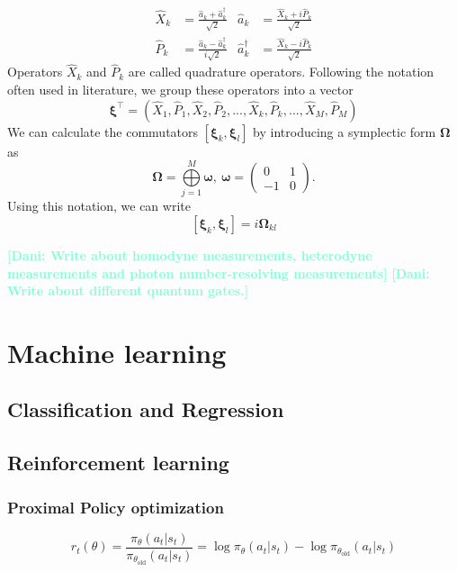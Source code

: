 \documentclass[12pt, a4paper,  nobibnotes]{article}
\newcommand{\op}[1]{\hat{#1}}
\newcommand{\nd}[1]{\textcolor{Aquamarine}{\textbf{[Dani: #1]}}}
\begin{document}
\begin{align}
  \op X_k &= \frac{\op a_k+\op a_k^\dagger}{\sqrt{2}}  & \op a_k &= \frac{\op X_k + i\op P_k}{\sqrt{2}}  \\ 
  \op P_k &= \frac{\op a_k-\op a_k^\dagger}{i\sqrt{2}} & \op a_k^\dagger &= \frac{\op X_k - i\op P_k}{\sqrt{2}}
   \label{eq:jwtransform}
\end{align}
Operators $\op X_k$ and $\op P_k$ are called quadrature operators. Following the notation often used in literature, we group these operators into a vector 
\begin{equation}
    \pmb\xi^\top = (\op X_1, \op P_1, \op X_2, \op P_2, ..., \op X_k, \op P_k, ..., \op X_M, \op P_M)
    \label{eq:xidef}
\end{equation}
We can calculate the commutators $\left[\pmb\xi_k,\pmb\xi_l\right]$ by introducing a symplectic form $\pmb\Omega$ as
\begin{equation}
    \pmb\Omega = \bigoplus\limits_{j=1}^{M}\pmb\omega,~\pmb\omega = 
    \begin{pmatrix}
    0 & 1 \\
    -1 & 0
    \end{pmatrix}.
\end{equation}
Using this notation, we can write
\begin{equation}
    \left[\pmb\xi_k,\pmb\xi_l\right] = i\pmb\Omega_{kl}
\end{equation}

\nd{Write about homodyne measurements, heterodyne measurements and photon number-resolving measurements}
\nd{Write about different quantum gates.}

\section{Machine learning}
\subsection{Classification and Regression}
\subsection{Reinforcement learning}
\subsubsection{Proximal Policy optimization}
\begin{equation}
r_t(\theta) = \frac{\pi_{\theta}(a_t|s_t)}{\pi_{\theta_{\textrm{old}}}(a_t|s_t)}
= \log\pi_{\theta}(a_t|s_t) - \log \pi_{\theta_{\textrm{old}}}(a_t|s_t)
\end{equation}
\end{document}
